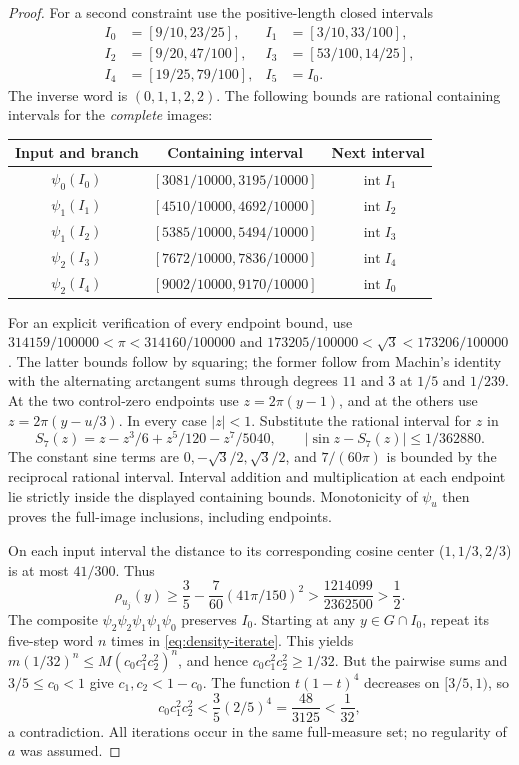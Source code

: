 \documentclass[11pt,reqno]{amsart}
\numberwithin{equation}{section}
\theoremstyle{definition}
\theoremstyle{definition}
\newcommand{\intr}{\operatorname{int}}
\begin{document}
\begin{proof}
For a second constraint use the positive-length closed intervals
\begin{align*}
 I_0&=[9/10,23/25],& I_1&=[3/10,33/100],\\
 I_2&=[9/20,47/100],& I_3&=[53/100,14/25],\\
 I_4&=[19/25,79/100],& I_5&=I_0.
\end{align*}
The inverse word is $(0,1,1,2,2)$. The following bounds are
rational containing intervals for the \emph{complete} images:
\begin{center}
\begin{tabular}{ccc}
\toprule
Input and branch&Containing interval&Next interval\\
\midrule
$\psi_0(I_0)$&$[3081/10000,3195/10000]$&$\intr I_1$\\
$\psi_1(I_1)$&$[4510/10000,4692/10000]$&$\intr I_2$\\
$\psi_1(I_2)$&$[5385/10000,5494/10000]$&$\intr I_3$\\
$\psi_2(I_3)$&$[7672/10000,7836/10000]$&$\intr I_4$\\
$\psi_2(I_4)$&$[9002/10000,9170/10000]$&$\intr I_0$\\
\bottomrule
\end{tabular}
\end{center}
For an explicit verification of every endpoint bound, use
$314159/100000<\pi<314160/100000$ and
$173205/100000<\sqrt3<173206/100000$.
The latter bounds follow by squaring; the former follow from
Machin's identity with the alternating arctangent sums through
degrees $11$ and $3$ at $1/5$ and $1/239$.
At the two control-zero endpoints use $z=2\pi(y-1)$, and at
the others use $z=2\pi(y-u/3)$. In every case $|z|<1$.
Substitute the rational interval for $z$ in
\[
 S_7(z)=z-z^3/6+z^5/120-z^7/5040,\qquad
 |\sin z-S_7(z)|\le1/362880.
\]
The constant sine terms are $0,-\sqrt3/2,\sqrt3/2$, and
$7/(60\pi)$ is bounded by the reciprocal rational interval.
Interval addition and multiplication at each endpoint lie strictly
inside the displayed containing bounds. Monotonicity of $\psi_u$
then proves the full-image inclusions, including endpoints.

On each input interval the distance to its corresponding cosine
center ($1,1/3,2/3$) is at most $41/300$. Thus
\[
 \rho_{u_j}(y)\ge\frac35-\frac7{60}(41\pi/150)^2
 >\frac{1214099}{2362500}>\frac12.
\]
The composite $\psi_2\psi_2\psi_1\psi_1\psi_0$ preserves
$I_0$. Starting at any $y\in G\cap I_0$, repeat its five-step
word $n$ times in \eqref{eq:density-iterate}. This yields
$m(1/32)^n\le M(c_0c_1^2c_2^2)^n$, and hence
$c_0c_1^2c_2^2\ge1/32$. But the pairwise sums and
$3/5\le c_0<1$ give $c_1,c_2<1-c_0$. The function
$t(1-t)^4$ decreases on $[3/5,1)$, so
\[
 c_0c_1^2c_2^2<\frac35(2/5)^4=\frac{48}{3125}<\frac1{32},
\]
a contradiction. All iterations occur in the same full-measure
set; no regularity of $a$ was assumed.
\end{proof}
\end{document}
